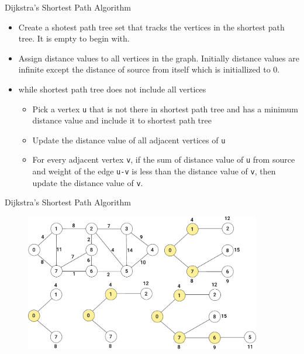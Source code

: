 \documentclass[aspectratio=169,8pt]{beamer}
\begin{document}
\begin{frame}{Dijkstra's Shortest Path Algorithm}
  \begin{itemize}
  \item Create a shotest path tree set that tracks the vertices in the shortest path tree. It is empty
    to begin with.
  \item Assign distance values to all vertices in the graph. Initially distance values are infinite
    except the distance of source from itself which is initiallized to 0.
  \item while shortest path tree does not include all vertices
    \begin{itemize}
    \item Pick a vertex {\tt u} that is not there in shortest path tree and has a minimum distance value and
      include it to shortest path tree
    \item Update the distance value of all adjacent vertices of {\tt u}
    \item For every adjacent vertex {\tt v}, if the sum of distance value of {\tt u} from source and weight
      of the edge {\tt u-v} is less than the distance value of {\tt v}, then update the distance value of
      {\tt v}.
    \end{itemize}
  \end{itemize}
\end{frame}
\begin{frame}[fragile]{Dijkstra's Shortest Path Algorithm}
  \begin{center}
    \begin{figure}
	    \includegraphics[height=60mm]{dijkstra}
    \end{figure}
  \end{center}
\end{frame}
\end{document}
